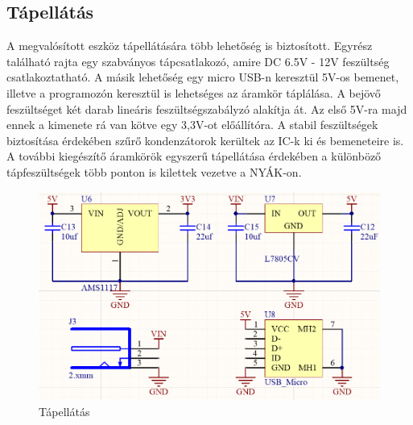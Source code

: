 \subsection{Tápellátás}
A megvalósított eszköz tápellátására több lehetőség is biztosított. Egyrész található rajta egy szabványos tápcsatlakozó, amire DC 6.5V - 12V feszültség csatlakoztatható. A másik lehetőség egy micro USB-n keresztül 5V-os bemenet, illetve a programozón keresztül is lehetséges az áramkör táplálása. A bejövő feszültséget két darab lineáris feszültségszabályzó alakítja át. Az első 5V-ra majd ennek a kimenete rá van kötve egy 3,3V-ot előállítóra. A stabil feszültségek biztosítása érdekében szűrő kondenzátorok kerültek az IC-k ki és bemeneteire is. A további kiegészítő áramkörök egyszerű tápellátása érdekében a különböző tápfeszültségek több ponton is kilettek vezetve a NYÁK-on.

\begin{figure}[!ht]
    \centering
    \includegraphics[width=130mm, keepaspectratio]{figures/power.png}
    \caption{Tápellátás}
    \label{fig:TeXstudio}
\end{figure}


